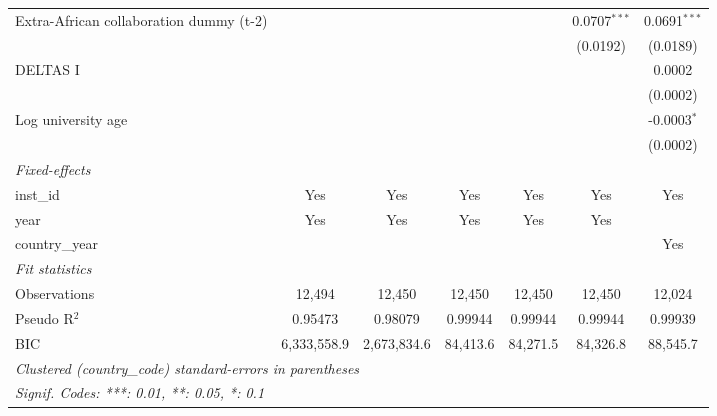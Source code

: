 \begin{tabular}{lcccccc}
   Extra-African collaboration dummy (t-2) &               &                 &                 &                 & 0.0707$^{***}$  & 0.0691$^{***}$\\   
                                           &               &                 &                 &                 & (0.0192)        & (0.0189)\\   
   DELTAS I                                &               &                 &                 &                 &                 & 0.0002\\   
                                           &               &                 &                 &                 &                 & (0.0002)\\   
   Log university age                      &               &                 &                 &                 &                 & -0.0003$^{*}$\\   
                                           &               &                 &                 &                 &                 & (0.0002)\\   
   \midrule
   \emph{Fixed-effects}\\
   inst\_id                                & Yes           & Yes             & Yes             & Yes             & Yes             & Yes\\  
   year                                    & Yes           & Yes             & Yes             & Yes             & Yes             & \\  
   country\_year                           &               &                 &                 &                 &                 & Yes\\  
   \midrule
   \emph{Fit statistics}\\
   Observations                            & 12,494        & 12,450          & 12,450          & 12,450          & 12,450          & 12,024\\  
   Pseudo R$^2$                            & 0.95473       & 0.98079         & 0.99944         & 0.99944         & 0.99944         & 0.99939\\  
   BIC                                     & 6,333,558.9   & 2,673,834.6     & 84,413.6        & 84,271.5        & 84,326.8        & 88,545.7\\  
   \midrule \midrule
   \multicolumn{7}{l}{\emph{Clustered (country\_code) standard-errors in parentheses}}\\
   \multicolumn{7}{l}{\emph{Signif. Codes: ***: 0.01, **: 0.05, *: 0.1}}\\
\end{tabular}
\par\endgroup


